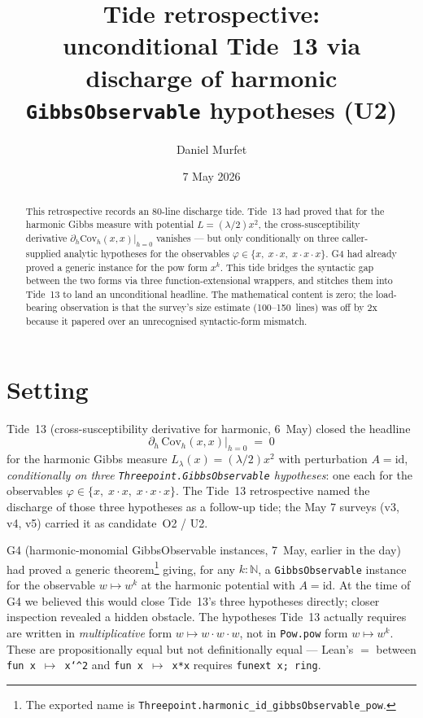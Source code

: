 \documentclass[11pt]{article}
\title{Tide retrospective:\\unconditional Tide~13 via discharge of harmonic
\texttt{GibbsObservable} hypotheses (U2)}
\author{Daniel Murfet}
\date{7 May 2026}
\begin{document}
\maketitle

\begin{abstract}
This retrospective records an 80-line discharge tide. Tide~13 had
proved that for the harmonic Gibbs measure with potential
$L = (\lambda/2)x^2$, the cross-susceptibility derivative
$\partial_h \mathrm{Cov}_h(x, x)\big|_{h=0}$ vanishes --- but only
conditionally on three caller-supplied analytic
hypotheses for the observables
$\varphi \in \{x,\; x \cdot x,\; x \cdot x \cdot x\}$. G4 had already
proved a generic instance for the pow form $x^k$.
This tide bridges the syntactic gap between
the two forms via three function-extensional wrappers, and stitches
them into Tide~13 to land an unconditional headline. The mathematical
content is zero; the load-bearing observation is that the survey's
size estimate (100--150~lines) was off by 2x because it papered over
an unrecognised syntactic-form mismatch.
\end{abstract}

\section{Setting}

Tide~13 (cross-susceptibility derivative for harmonic, 6~May) closed
the headline
\[
  \partial_h\,\mathrm{Cov}_h(x, x)\big|_{h=0} \;=\; 0
\]
for the harmonic Gibbs measure
$L_\lambda(x) = (\lambda/2) x^2$ with perturbation $A = \mathrm{id}$,
\emph{conditionally on three \texttt{Threepoint.GibbsObservable}
hypotheses}: one each for the observables
$\varphi \in \{x, \;x \cdot x, \;x \cdot x \cdot x\}$. The Tide~13
retrospective named the discharge of those three hypotheses as a
follow-up tide; the May 7 surveys (v3, v4, v5) carried it as
candidate~O2 / U2.

G4 (harmonic-monomial GibbsObservable instances, 7~May,
earlier in the day) had proved a generic theorem\footnote{The
exported name is \texttt{Threepoint.harmonic\_id\_gibbsObservable\_pow}.}
giving, for any $k : \mathbb{N}$, a \texttt{GibbsObservable}
instance for the observable $w \mapsto w^k$ at the harmonic potential
with $A = \mathrm{id}$.
At the time of G4 we believed this would close Tide~13's three
hypotheses directly; closer inspection revealed a hidden obstacle.
The hypotheses Tide~13 actually requires are written in
\emph{multiplicative} form $w \mapsto w \cdot w \cdot w$, not in
\texttt{Pow.pow} form $w \mapsto w^k$. These are
propositionally equal but not definitionally equal — Lean's $=$
between \texttt{fun x \(\mapsto\) x\char`^{}2} and
\texttt{fun x \(\mapsto\) x*x} requires \texttt{funext x; ring}.
\end{document}
